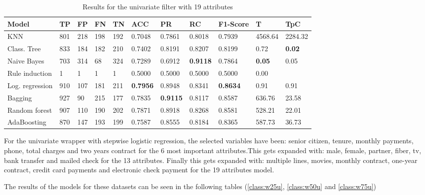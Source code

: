 \documentclass[a4paper,11pt]{article}
\begin{document}
\begin{table}
\centering
\begin{tabular}{|l|l|l|l|l|l|l|l|l|l|l|}
\hline

\textbf{Model} & \textbf{TP} & \textbf{FP} & \textbf{FN} & \textbf{TN} & \textbf{ACC} & \textbf{PR} & \textbf{RC} & \textbf{F1-Score} & \textbf{T} & \textbf{TpC} \\ \hline
KNN & 801 & 218 & 198 & 192 & 0.7048 & 0.7861 & 0.8018 & 0.7939 & 4568.64 & 2284.32 \\ \hline
Class. Tree & 833 & 184 & 182 & 210 & 0.7402 & 0.8191 & 0.8207 & 0.8199 & 0.72 & \textbf{0.02} \\ \hline
Naive Bayes & 703 & 314 & 68 & 324 & 0.7289 & 0.6912 & \textbf{0.9118} & 0.7864 & \textbf{0.05} & 0.05 \\ \hline
Rule induction & 1 & 1 & 1 & 1 & 0.5000 & 0.5000 & 0.5000 & 0.5000 & 0.00 \\ \hline
Log. regression & 910 & 107 & 181 & 211 & \textbf{0.7956} & 0.8948 & 0.8341 & \textbf{0.8634} & 0.91 & 0.91 \\ \hline
Bagging & 927 & 90 & 215 & 177 & 0.7835 & \textbf{0.9115} & 0.8117 & 0.8587 & 636.76 & 23.58 \\ \hline
Random forest & 907 & 110 & 190 & 202 & 0.7871 & 0.8918 & 0.8268 & 0.8581 & 528.21 & 22.01 \\ \hline
AdaBoosting & 870 & 147 & 193 & 199 & 0.7587 & 0.8555 & 0.8184 & 0.8365 & 587.73 & 36.73 \\ \hline

\end{tabular}
\caption{Results for the univariate filter with 19 attributes}
\label{class:f75u}
\end{table}

For the univariate wrapper with stepwise logistic regression, the selected variables have been: senior citizen, tenure, monthly payments, phone, total charges and two years contract for the 6 most important attributes.This gets expanded with: male, female, partner, fiber, tv, bank transfer and mailed check for the 13 attributes. Finally this gets expanded with: multiple lines, movies, monthly contract, one-year contract, credit card payments and electronic check payment for the 19 attributes model.

The results of the models for these datasets can be seen in the following tables (\ref{class:w25u}, \ref{class:w50u} and \ref{class:w75u})
\end{document}
